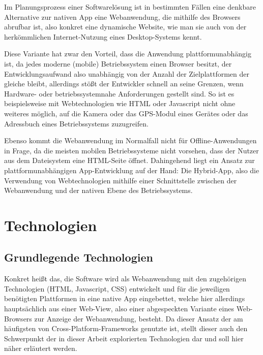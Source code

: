 \documentclass{scrreprt}
\begin{document}
Im Planungsprozess einer Softwarelösung ist in bestimmten Fällen eine denkbare Alternative zur nativen App eine Webanwendung, die mithilfe des Browsers abrufbar ist, also konkret eine dynamische Website, wie man sie auch von der herkömmlichen Internet-Nutzung eines Desktop-Systems kennt. 

Diese Variante hat zwar den Vorteil, dass die Anwendung plattformunabhängig ist, da jedes moderne (mobile) Betriebssystem einen Browser besitzt, der Entwicklungsaufwand also unabhängig von der Anzahl der Zielplattformen der gleiche bleibt, allerdings stößt der Entwickler schnell an seine Grenzen, wenn Hardware- oder betriebssystemnahe Anforderungen gestellt sind. So ist es beispielsweise mit Webtechnologien wie HTML oder Javascript nicht ohne weiteres möglich, auf die Kamera oder das GPS-Modul eines Gerätes oder das Adressbuch eines Betriebssystems zuzugreifen.

Ebenso kommt die Webanwendung im Normalfall nicht für Offline-Anwendungen in Frage, da die meisten mobilen Betriebssysteme nicht vorsehen, dass der Nutzer aus dem Dateisystem eine HTML-Seite öffnet.  
Dahingehend liegt ein Ansatz zur plattformunabhängigen App-Entwicklung auf der Hand: Die Hybrid-App, also die Verwendung von Webtechnologien mithilfe einer Schnittstelle zwischen der Webanwendung und der nativen Ebene des Betriebssystems.

\section{Technologien}
\subsection{Grundlegende Technologien}
Konkret heißt das, die Software wird als Webanwendung mit den zugehörigen Technologien (HTML, Javascript, CSS) entwickelt und für die jeweiligen benötigten Plattformen in eine native App eingebettet, welche hier allerdings hauptsächlich aus einer Web-View, also einer abgespeckten Variante eines Web-Browsers zur Anzeige der Webanwendung, besteht. Da dieser Ansatz der am häufigsten von Cross-Platform-Frameworks genutzte ist,  stellt dieser auch den Schwerpunkt der in dieser Arbeit explorierten Technologien dar und soll hier näher erläutert werden. 
\end{document}
